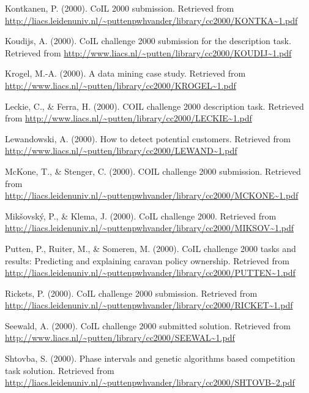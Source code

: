 \documentclass[man]{apa6}
\begin{document}
\leavevmode\hypertarget{ref-Kontkanen}{}%
Kontkanen, P. (2000). CoIL 2000 submission. Retrieved from \url{http://liacs.leidenuniv.nl/~puttenpwhvander/library/cc2000/KONTKA~1.pdf}

\leavevmode\hypertarget{ref-Koudijs}{}%
Koudijs, A. (2000). CoIL challenge 2000 submission for the description task. Retrieved from \url{http://www.liacs.nl/~putten/library/cc2000/KOUDIJ~1.pdf}

\leavevmode\hypertarget{ref-Krogel}{}%
Krogel, M.-A. (2000). A data mining case study. Retrieved from \url{http://www.liacs.nl/~putten/library/cc2000/KROGEL~1.pdf}

\leavevmode\hypertarget{ref-Leckie}{}%
Leckie, C., \& Ferra, H. (2000). COIL challenge 2000 description task. Retrieved from \url{http://www.liacs.nl/~putten/library/cc2000/LECKIE~1.pdf}

\leavevmode\hypertarget{ref-Lewandowski}{}%
Lewandowski, A. (2000). How to detect potential customers. Retrieved from \url{http://www.liacs.nl/~putten/library/cc2000/LEWAND~1.pdf}

\leavevmode\hypertarget{ref-McKone}{}%
McKone, T., \& Stenger, C. (2000). COIL challenge 2000 submission. Retrieved from \url{http://liacs.leidenuniv.nl/~puttenpwhvander/library/cc2000/MCKONE~1.pdf}

\leavevmode\hypertarget{ref-Miksovsky}{}%
Mikšovský, P., \& Klema, J. (2000). CoIL challenge 2000. Retrieved from \url{http://liacs.leidenuniv.nl/~puttenpwhvander/library/cc2000/MIKSOV~1.pdf}

\leavevmode\hypertarget{ref-Putten}{}%
Putten, P., Ruiter, M., \& Someren, M. (2000). CoIL challenge 2000 tasks and results: Predicting and explaining caravan policy ownership. Retrieved from \url{http://liacs.leidenuniv.nl/~puttenpwhvander/library/cc2000/PUTTEN~1.pdf}

\leavevmode\hypertarget{ref-Rickets}{}%
Rickets, P. (2000). CoIL challenge 2000 submission. Retrieved from \url{http://liacs.leidenuniv.nl/~puttenpwhvander/library/cc2000/RICKET~1.pdf}

\leavevmode\hypertarget{ref-Seewald}{}%
Seewald, A. (2000). CoIL challenge 2000 submitted solution. Retrieved from \url{http://www.liacs.nl/~putten/library/cc2000/SEEWAL~1.pdf}

\leavevmode\hypertarget{ref-Shtovba}{}%
Shtovba, S. (2000). Phase intervals and genetic algorithms based competition task solution. Retrieved from \url{http://liacs.leidenuniv.nl/~puttenpwhvander/library/cc2000/SHTOVB~2.pdf}
\end{document}
